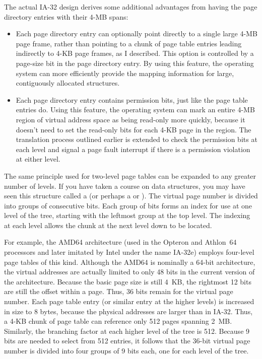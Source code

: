 The
actual IA-32 design derives some additional advantages from having the page
directory entries with their 4-MB spans:
\begin{itemize}
\item
Each page directory entry can optionally point directly to a single
large 4-MB page frame, rather than pointing to a chunk of page table
entries leading indirectly to 4-KB page frames, as I described.  This
option is controlled by a page-size bit in the page directory entry.
By using this feature, the operating system can more efficiently
provide the mapping information for large, contiguously allocated
structures.
\item
Each page directory entry contains permission bits, just like the page
table entries do.  Using this feature, the operating system can mark
an entire 4-MB region of virtual address space as being read-only
more quickly, because it doesn't need to set the read-only bits
for each 4-KB page in the region.  The translation process
outlined earlier is extended to check the permission bits at each
level and signal a page fault interrupt if there is a permission
violation at either level.
\end{itemize}

The same principle used for two-level page tables can be expanded to
any greater number of levels.  If you have taken a course on data
structures, you may have seen this structure called a  (or
perhaps a  or ).  The
virtual page number is divided into groups of consecutive bits.  Each
group of bits forms an index for use at one level of the tree,
starting with the leftmost group at the top level.  The indexing at
each level allows the chunk at the next level down to be located.

For example, the AMD64 architecture (used in the Opteron and Athlon~64
processors and later imitated by Intel under the name IA-32e) employs
four-level page tables of this kind.  Although the AMD64 is nominally
a 64-bit architecture, the virtual addresses are actually limited to
only 48 bits in the current version of the architecture.  Because the
basic page size is still 4~KB, the rightmost 12 bits are still the
offset within a page.  Thus, 36 bits remain for the virtual page
number.  Each page table entry (or similar entry at the higher levels)
is increased in size to 8 bytes, because the physical addresses
are larger than in IA-32.  Thus, a 4-KB chunk of page table can reference
only 512 pages spanning 2~MB.  Similarly, the branching factor
at each higher level of the tree is 512.  Because 9 bits are needed
to select from 512 entries, it follows that the 36-bit virtual page
number is divided into four groups of 9 bits each, one for each
level of the tree.

